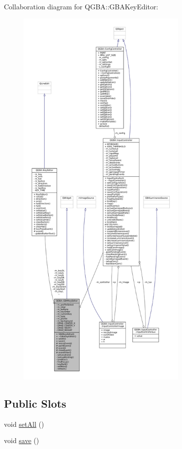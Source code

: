 Collaboration diagram for Q\+G\+BA\+:\+:G\+B\+A\+Key\+Editor\+:
\nopagebreak
\begin{figure}[H]
\begin{center}
\leavevmode
\includegraphics[height=550pt]{class_q_g_b_a_1_1_g_b_a_key_editor__coll__graph}
\end{center}
\end{figure}
\subsection*{Public Slots}
\begin{DoxyCompactItemize}
\item 
void \mbox{\hyperlink{class_q_g_b_a_1_1_g_b_a_key_editor_a4069ad1c61470f1d304aa7b7cf944261}{set\+All}} ()
\item 
void \mbox{\hyperlink{class_q_g_b_a_1_1_g_b_a_key_editor_a5ba1c13fc509a7344afda968e6521436}{save}} ()
\end{DoxyCompactItemize}
